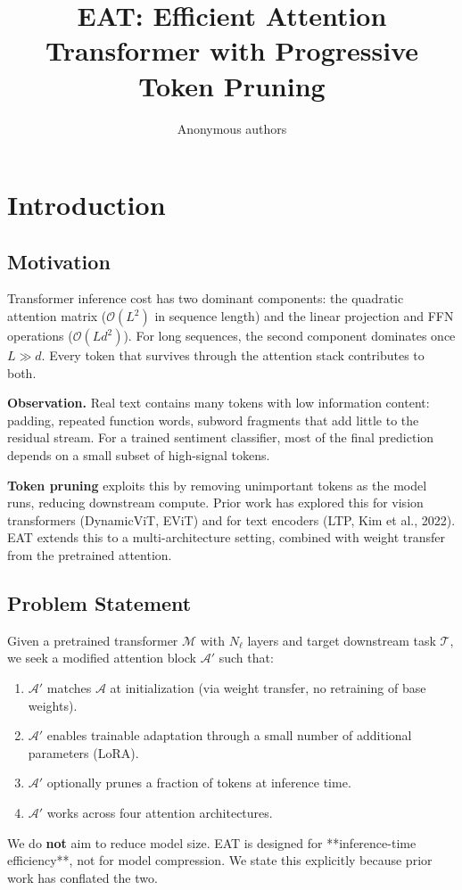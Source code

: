 \title{\textbf{EAT: Efficient Attention Transformer with Progressive Token Pruning}}

\author{Anonymous authors}



\section{Introduction}

\subsection{Motivation}

Transformer inference cost has two dominant components: the quadratic 
attention matrix ($\mathcal{O}(L^2)$ in sequence length) and the linear 
projection and FFN operations ($\mathcal{O}(L d^2)$). For long sequences, 
the second component dominates once $L \gg d$. Every token that survives 
through the attention stack contributes to both.

\textbf{Observation.} Real text contains many tokens with low information content: 
padding, repeated function words, subword fragments that add little to the 
residual stream. For a trained sentiment classifier, most of the final 
prediction depends on a small subset of high-signal tokens.

\textbf{Token pruning} exploits this by removing unimportant tokens as the model 
runs, reducing downstream compute. Prior work has explored this for vision 
transformers (DynamicViT, EViT) and for text encoders (LTP, Kim et al., 2022). 
EAT extends this to a multi-architecture setting, combined with weight 
transfer from the pretrained attention.

\subsection{Problem Statement}

Given a pretrained transformer $\mathcal{M}$ with $N_\ell$ layers and target 
downstream task $\mathcal{T}$, we seek a modified attention block $\mathcal{A}'$ 
such that:

\begin{enumerate}
\item $\mathcal{A}'$ matches $\mathcal{A}$ at initialization (via weight
  transfer, no retraining of base weights).
\item $\mathcal{A}'$ enables trainable adaptation through a small number of
  additional parameters (LoRA).
\item $\mathcal{A}'$ optionally prunes a fraction of tokens at inference time.
\item $\mathcal{A}'$ works across four attention architectures.

\end{enumerate}
We do \textbf{not} aim to reduce model size. EAT is designed for **inference-time 
efficiency**, not for model compression. We state this explicitly because 
prior work has conflated the two.


